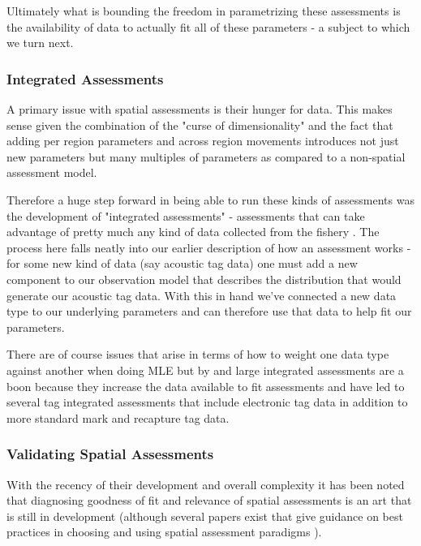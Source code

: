 \documentclass[11pt]{article}
\begin{document}
Ultimately what is bounding the freedom in parametrizing these assessments is the availability of data to actually fit all of these parameters \cite{goethel2023} - a subject to which we turn next.

\subsubsection{Integrated Assessments}

A primary issue with spatial assessments is their hunger for data. This makes sense given the combination of the "curse of dimensionality" and the fact that adding per region parameters and across region movements introduces not just new parameters but many multiples of parameters as compared to a non-spatial assessment model. 

Therefore a huge step forward in being able to run these kinds of assessments was the development of "integrated assessments" - assessments that can take advantage of pretty much any kind of data collected from the fishery \cite{sippel2014}. The process here falls neatly into our earlier description of how an assessment works - for some new kind of data (say acoustic tag data) one must add a new component to our observation model that describes the distribution that would generate our acoustic tag data. With this in hand we've connected a new data type to our underlying parameters and can therefore use that data to help fit our parameters. 

There are of course issues that arise in terms of how to weight one data type against another when doing MLE \cite{sippel2014} \cite{punt2019} but by and large integrated assessments are a boon because they increase the data available to fit assessments and have led to several tag integrated assessments that include electronic tag data in addition to more standard mark and recapture tag data. 

\subsubsection{Validating Spatial Assessments}

With the recency of their development and overall complexity it has been noted that diagnosing goodness of fit and relevance of spatial assessments is an art that is still in development (although several papers exist that give guidance on best practices in choosing and using spatial assessment paradigms \cite{goethel2023} \cite{punt2019}). 
\end{document}

